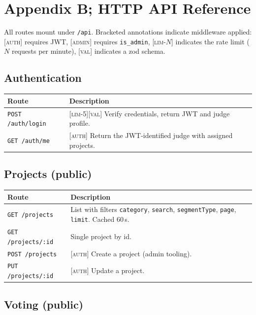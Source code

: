 \section{Appendix B; HTTP API Reference}
\label{app:api}

All routes mount under \texttt{/api}. Bracketed annotations indicate
middleware applied: [\textsc{auth}] requires JWT, [\textsc{admin}]
requires \texttt{is\_admin}, [\textsc{lim}-\(N\)] indicates the rate
limit (\(N\) requests per minute), [\textsc{val}] indicates a zod schema.

\subsection{Authentication}

\begin{longtable}{p{}p{}}
  \toprule
  \textbf{Route}                       & \textbf{Description} \\ \midrule
  \texttt{POST /auth/login}            & [\textsc{lim}-5][\textsc{val}] Verify credentials, return JWT and judge profile. \\
  \texttt{GET  /auth/me}               & [\textsc{auth}] Return the JWT-identified judge with assigned projects. \\
  \bottomrule
\end{longtable}

\subsection{Projects (public)}

\begin{longtable}{p{}p{}}
  \toprule
  \textbf{Route} & \textbf{Description} \\ \midrule
  \texttt{GET  /projects}        & List with filters \texttt{category}, \texttt{search}, \texttt{segmentType}, \texttt{page}, \texttt{limit}. Cached 60\,s. \\
  \texttt{GET  /projects/:id}    & Single project by id. \\
  \texttt{POST /projects}        & [\textsc{auth}] Create a project (admin tooling). \\
  \texttt{PUT  /projects/:id}    & [\textsc{auth}] Update a project. \\
  \bottomrule
\end{longtable}

\subsection{Voting (public)}

